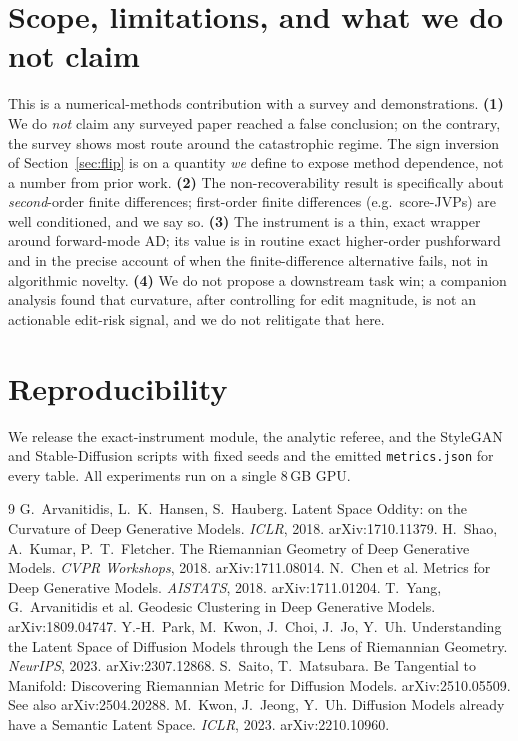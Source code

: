 \documentclass[11pt]{article}
\begin{document}
\section{Scope, limitations, and what we do not claim}
\label{sec:scope}
This is a numerical-methods contribution with a survey and demonstrations.
\textbf{(1)} We do \emph{not} claim any surveyed paper reached a false conclusion;
on the contrary, the survey shows most route around the catastrophic regime. The
sign inversion of Section~\ref{sec:flip} is on a quantity \emph{we} define to
expose method dependence, not a number from prior work.
\textbf{(2)} The non-recoverability result is specifically about \emph{second}-order
finite differences; first-order finite differences (e.g.\ score-JVPs) are well
conditioned, and we say so.
\textbf{(3)} The instrument is a thin, exact wrapper around forward-mode AD; its
value is in routine exact higher-order pushforward and in the precise account of
when the finite-difference alternative fails, not in algorithmic novelty.
\textbf{(4)} We do not propose a downstream task win; a companion analysis found
that curvature, after controlling for edit magnitude, is not an actionable
edit-risk signal, and we do not relitigate that here.

\section{Reproducibility}
We release the exact-instrument module, the analytic referee, and the StyleGAN
and Stable-Diffusion scripts with fixed seeds and the emitted
\texttt{metrics.json} for every table. All experiments run on a single 8\,GB GPU.


\begin{thebibliography}{9}
\small
{} G.~Arvanitidis, L.~K.~Hansen,
S.~Hauberg. Latent Space Oddity: on the Curvature of Deep Generative Models.
\emph{ICLR}, 2018. arXiv:1710.11379.
 H.~Shao, A.~Kumar, P.~T.~Fletcher. The
Riemannian Geometry of Deep Generative Models. \emph{CVPR Workshops}, 2018.
arXiv:1711.08014.
 N.~Chen et al. Metrics for Deep Generative
Models. \emph{AISTATS}, 2018. arXiv:1711.01204.
 T.~Yang, G.~Arvanitidis et al. Geodesic
Clustering in Deep Generative Models. arXiv:1809.04747.
 Y.-H.~Park, M.~Kwon, J.~Choi, J.~Jo,
Y.~Uh. Understanding the Latent Space of Diffusion Models through the Lens of
Riemannian Geometry. \emph{NeurIPS}, 2023. arXiv:2307.12868.
 S.~Saito, T.~Matsubara. Be
Tangential to Manifold: Discovering Riemannian Metric for Diffusion Models.
arXiv:2510.05509. See also arXiv:2504.20288.
 M.~Kwon, J.~Jeong, Y.~Uh. Diffusion Models
already have a Semantic Latent Space. \emph{ICLR}, 2023. arXiv:2210.10960.
\end{thebibliography}
\end{document}
